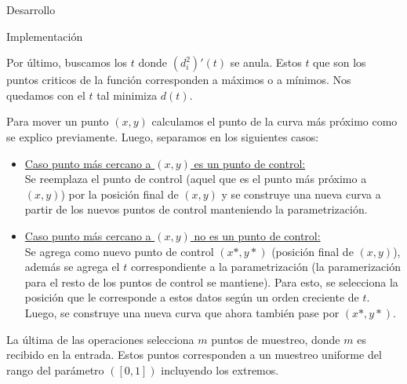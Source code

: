 \begin{section}{Desarrollo}
\begin{subsection}{Implementación}
\begin{itemize}
				Por último, buscamos los $t$ donde $(d_i^2)'(t)$ se anula. Estos $t$ que son los puntos criticos de la función corresponden a máximos o a mínimos. 
				Nos quedamos con el $t$ tal minimiza $d(t)$.
				
				Para mover un punto $(x,y)$	calculamos el punto de la curva más próximo como se explico previamente. Luego, separamos en los siguientes casos:
				
				\begin{itemize}
					\item \underline{Caso punto más cercano a $(x,y)$ es un punto de control:}\\
					
						Se reemplaza el punto de control (aquel que es el punto más próximo a $(x,y)$) por la posición final de $(x,y)$ y se construye una
						nueva curva a partir de los nuevos puntos de control manteniendo la parametrización.\\
					
					\item \underline{Caso punto más cercano a $(x,y)$ no es un punto de control:}\\
					
						Se agrega como nuevo punto de control $(x*,y*)$ (posición final de $(x,y)$), además se agrega el $t$ correspondiente a la parametrización 
						(la paramerización para el resto de los puntos de control se mantiene).
						Para esto, se selecciona la posición que le corresponde a estos datos según un orden creciente de $t$. Luego, se construye una nueva curva
						que ahora también pase por $(x*,y*)$.
				\end{itemize}
				
				La última de las operaciones selecciona $m$ puntos de muestreo, donde $m$ es recibido en la entrada.
				Estos puntos corresponden a un muestreo uniforme del rango del parámetro $([0,1])$ incluyendo los extremos.
		\end{itemize}
	\end{subsection}
\end{section}

